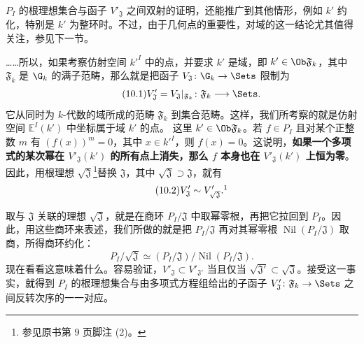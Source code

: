 $P_I$ 的根理想集合与函子 $V'_{\mathfrak J}$ 之间双射的证明，还能推广到其他情形，例如 $k'$ 约化，特别是 $k'$ 为整环时。不过，由于几何点的重要性，对域的这一结论尤其值得关注，参见下一节。

……所以，如果考察仿射空间 $k'^I$ 中的点，并要求 $k'$ 是域，即 $k'\in\Ob\mathfrak F_k$，其中 $\mathfrak F_k$ 是 $\G_k$ 的满子范畴，那么就是把函子 $V_{\mathfrak J}\colon\G_k\to\Sets$ 限制为
\begin{equation}\tag{10.1}V'_{\mathfrak J}=V_{\mathfrak J}|_{\mathfrak F_k}\colon\mathfrak F_k\longrightarrow\Sets.
\end{equation}
它从同时为 $k$-代数的域所成的范畴 $\mathfrak F_k$ 到集合范畴。这样，我们所考察的就是仿射空间 $\mathbb E^I(k')$ 中坐标属于域 $k'$ 的点。
这里 $k'\in\Ob\mathfrak F_k$。若 $f\in P_I$ 且对某个正整数 $m$ 有 $(f(x))^m=0$，其中 $x\in k'^I$，则 $f(x)=0$。这说明，\textbf{如果一个多项式的某次幂在 $V'_{\mathfrak J}(k')$ 的所有点上消失，那么 $f$ 本身也在 $V'_{\mathfrak J}(k')$ 上恒为零}。因此，用根理想 $\sqrt{\mathfrak J}$\footnote{参见原书第 9 页脚注 (2)。}替换 $\mathfrak J$，其中 $\sqrt{\mathfrak J}\supset\mathfrak J$，就有
\begin{equation}\tag{10.2}V'_{\mathfrak J}\sim V'_{\sqrt{\mathfrak J}}.\footnotemark
\end{equation}

取与 $\mathfrak J$ 关联的理想 $\sqrt{\mathfrak J}$，就是在商环 $P_I/\mathfrak J$ 中取幂零根，再把它拉回到 $P_I$。因此，用这些商环来表述，我们所做的就是把 $P_I/\mathfrak J$ 再对其幂零根 $\operatorname{Nil}(P_I/\mathfrak J)$ 取商，所得商环约化：
\begin{equation}\tag{10.3}P_I/\sqrt{\mathfrak J}\simeq(P_I/\mathfrak J)/\operatorname{Nil}(P_I/\mathfrak J).
\end{equation}
现在看看这意味着什么。容易验证，$V'_{\mathfrak J}\subset V'_{\mathfrak J'}$ 当且仅当 $\sqrt{\mathfrak J'}\subset\sqrt{\mathfrak J}$。接受这一事实，就得到 $P_I$ 的根理想集合与由多项式方程组给出的子函子 $V'_{\mathfrak J}\colon\mathfrak F_k\to\Sets$ 之间反转次序的一一对应。

